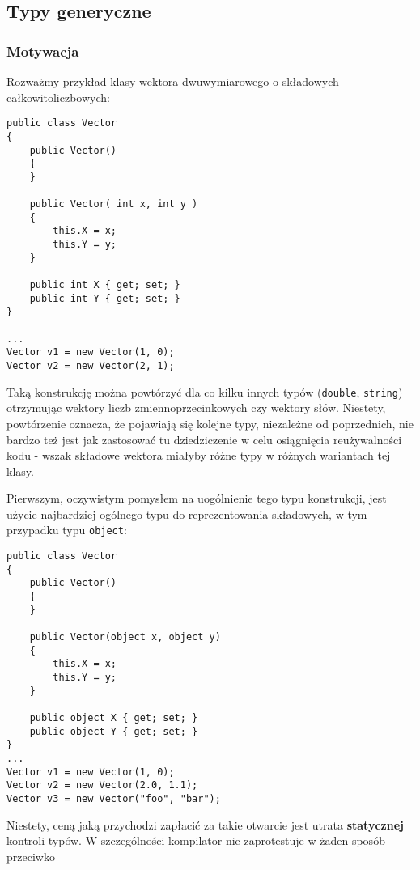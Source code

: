 ﻿\subsection{Typy generyczne}

\subsubsection{Motywacja}

Rozważmy przykład klasy wektora dwuwymiarowego o składowych całkowitoliczbowych:

\begin{scriptsize}
\begin{verbatim}
public class Vector
{
    public Vector()
    {
    }

    public Vector( int x, int y )
    {
        this.X = x;
        this.Y = y;
    }

    public int X { get; set; }
    public int Y { get; set; }
}

...
Vector v1 = new Vector(1, 0);
Vector v2 = new Vector(2, 1);
\end{verbatim}
\end{scriptsize}

Taką konstrukcję można powtórzyć dla co kilku innych typów ({\tt double}, {\tt string}) otrzymując wektory liczb
zmiennoprzecinkowych czy wektory słów. Niestety, powtórzenie oznacza, że pojawiają się kolejne typy, niezależne od poprzednich,
nie bardzo też jest jak zastosować tu dziedziczenie w celu osiągnięcia reużywalności kodu - wszak składowe wektora miałyby
różne typy w różnych wariantach tej klasy.

Pierwszym, oczywistym pomysłem na uogólnienie tego typu konstrukcji, jest użycie najbardziej ogólnego typu do
reprezentowania składowych, w tym przypadku typu {\tt object}:

\begin{scriptsize}
\begin{verbatim}
public class Vector
{
    public Vector()
    {
    }

    public Vector(object x, object y)
    {
        this.X = x;
        this.Y = y;
    }

    public object X { get; set; }
    public object Y { get; set; }
}
...
Vector v1 = new Vector(1, 0);
Vector v2 = new Vector(2.0, 1.1);
Vector v3 = new Vector("foo", "bar");
\end{verbatim}
\end{scriptsize}

Niestety, ceną jaką przychodzi zapłacić za takie otwarcie jest utrata {\bf statycznej} kontroli typów. W szczególności
kompilator nie zaprotestuje w żaden sposób przeciwko

